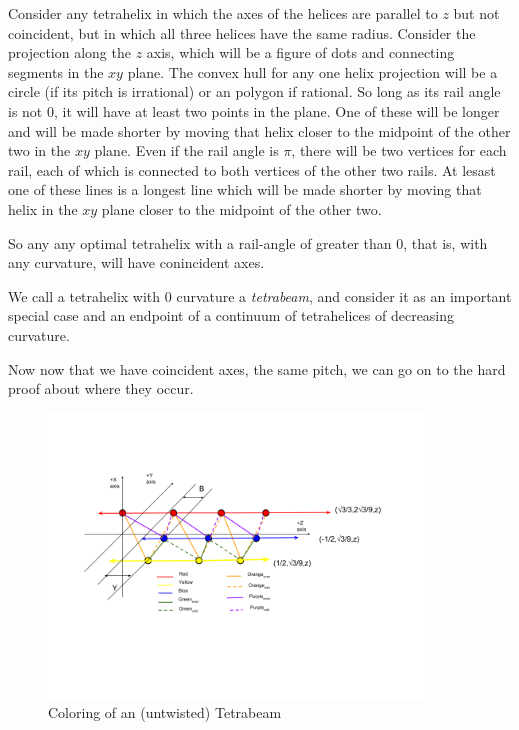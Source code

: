 \documentclass[11pt]{article}
\begin{document}
Consider any tetrahelix in which the axes of the helices are parallel to $z$ but not coincident, but in which all three helices have the same
radius. Consider the projection along the $z$ axis, which will be a figure of dots and connecting segments in the $xy$ plane. The convex
hull for any one helix projection will be a circle (if its pitch is irrational) or an polygon if rational. So long as its rail angle is
not $0$, it will have at least two points in the plane. One of these will be longer and will be made shorter by moving that helix closer
to the midpoint of the other two in the $xy$ plane. Even if the rail angle is $\pi$, there will be two vertices for each rail, each of
which is connected to both vertices of the other two rails. At lesast one of these lines is a longest line which will be made shorter by moving
that helix in the $xy$ plane closer to the midpoint of the other two.

So any any optimal tetrahelix with a rail-angle of greater than $0$, that is, with any curvature, will have conincident axes.

We call a tetrahelix with $0$ curvature a \emph{tetrabeam}, and consider it as an important special case and an endpoint of a continuum
of tetrahelices of decreasing curvature.


 Now now that we have coincident axes, the same pitch, we can go on to the hard proof about where they occur.

 \begin{figure}[H]
     \centering
     \includegraphics[width=0.9\textwidth]{figures/TetrahelixColoringDiagram.png}
     \caption{Coloring of an (untwisted) Tetrabeam}
 \end{figure}
\end{document}

